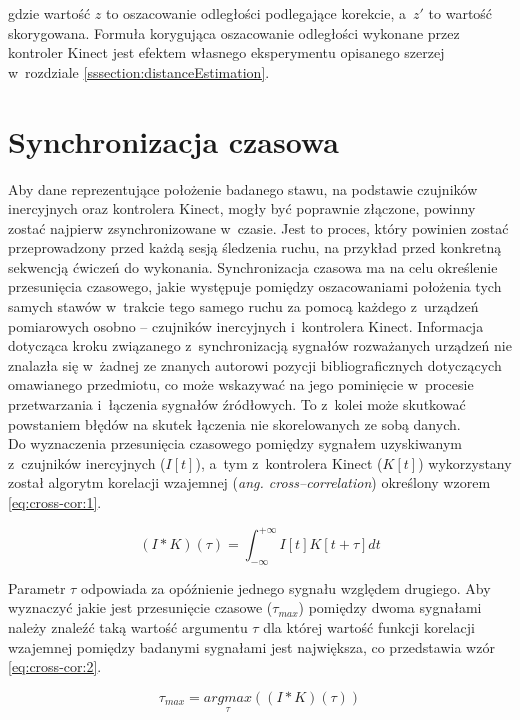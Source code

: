 gdzie wartość $z$ to oszacowanie odległości podlegające korekcie, a~$z'$ to wartość skorygowana. Formuła korygująca oszacowanie odległości wykonane przez kontroler Kinect jest efektem własnego eksperymentu opisanego szerzej w~rozdziale \ref{sssection:distanceEstimation}.
										
\section{Synchronizacja czasowa}
										
Aby dane reprezentujące położenie badanego stawu, na podstawie czujników inercyjnych oraz kontrolera Kinect, mogły być poprawnie złączone, powinny zostać najpierw zsynchronizowane w~czasie. Jest to proces, który powinien zostać przeprowadzony przed każdą sesją śledzenia ruchu, na przykład przed konkretną sekwencją ćwiczeń do wykonania. Synchronizacja czasowa ma na celu określenie przesunięcia czasowego, jakie występuje pomiędzy oszacowaniami położenia tych samych stawów w~trakcie tego samego ruchu za pomocą każdego z~urządzeń pomiarowych osobno -- czujników inercyjnych i~kontrolera Kinect. Informacja dotycząca kroku związanego z~synchronizacją sygnałów rozważanych urządzeń nie znalazła się w~żadnej ze znanych autorowi pozycji bibliograficznych dotyczących omawianego przedmiotu, co może wskazywać na jego pominięcie w~procesie przetwarzania i~łączenia sygnałów źródłowych. To z~kolei może skutkować powstaniem błędów na skutek łączenia nie skorelowanych ze sobą danych.\\
Do wyznaczenia przesunięcia czasowego pomiędzy sygnałem uzyskiwanym z~czujników inercyjnych ($I[t]$), a~tym z~kontrolera Kinect ($K[t]$) wykorzystany został algorytm korelacji wzajemnej (\emph{ang. cross--correlation}) określony wzorem \ref{eq:cross-cor:1}.

\begin{equation}
	(I \ast K)(\tau) = \int_{-\infty}^{+\infty}I[t]K[t+\tau]dt
	\label{eq:cross-cor:1}
\end{equation}

Parametr $\tau$ odpowiada za opóźnienie jednego sygnału względem drugiego. Aby wyznaczyć jakie jest przesunięcie czasowe ($\tau_{max}$) pomiędzy dwoma sygnałami należy znaleźć taką wartość argumentu $\tau$ dla której wartość funkcji korelacji wzajemnej pomiędzy badanymi sygnałami jest największa, co przedstawia wzór \ref{eq:cross-cor:2}.										
										
\begin{equation}
	\tau_{max}       = \underset{\tau}{argmax}((I \ast K)(\tau))
	\label{eq:cross-cor:2} 
\end{equation}

